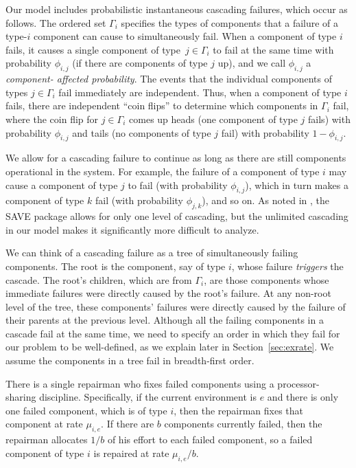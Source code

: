 \documentclass[12pt]{article}
\begin{document}
Our model includes probabilistic instantaneous cascading failures, which occur
as follows. The ordered set $\Gamma_i$ specifies the types of components that a
failure of a type-$i$ component can cause to simultaneously fail. When a
component of type $i$ fails, it causes a single  component of type~$j \in
\Gamma_i$ to fail at the same time with probability $\phi_{i, j}$ (if there are
components of type $j$ up), and we call $\phi_{i, j}$  a \textit{component-
affected probability}. The events that the individual components of types $j \in
\Gamma_i$ fail immediately are independent. Thus, when a component of type $i$
fails, there are independent ``coin flips'' to determine which components in
$\Gamma_i$ fail, where the coin flip for $j \in \Gamma_i$ comes up heads (one
component of type $j$ fails) with probability $\phi_{i, j}$ and tails (no
components of type $j$ fail) with probability $1 - \phi_{i, j}$.

We allow for a cascading failure to continue as long as there are still
components operational in the system.  For example, the failure of a component
of type $i$ may cause a component of type $j$ to fail (with probability
$\phi_{i, j}$), which in turn makes a component of type $k$ fail (with
probability $\phi_{j, k}$), and so on. As noted in \cite{ING:2009}, the SAVE
package \cite{BHLNS:1994} allows for only one level of cascading, but the
unlimited cascading in our model makes it significantly more difficult to
analyze.

We can think of a cascading failure as a tree of simultaneously failing
components. The root is the component, say of type $i$, whose failure
\textit{triggers} the cascade. The root's children, which are from $\Gamma_i$,
are those components whose immediate failures were directly caused by the root's
failure. At any non-root level of the tree,  these components' failures were
directly caused by the failure of their parents at the previous level. Although
all the failing components in a cascade fail at the same time, we need to
specify an order in which they fail for our problem to be well-defined, as we
explain later in Section~\ref{sec:exrate}. We assume the components in a tree
fail in breadth-first order.

There is a single repairman who fixes failed components using a processor-
sharing discipline. Specifically, if the current environment is $e$ and there is
only one failed component, which is of type $i$, then the repairman fixes that
component at rate $\mu_{i, e}$. If there are $b$ components currently failed,
then the repairman allocates $1 / b$ of his effort to each failed component, so
a failed component of type $i$ is repaired at rate $\mu_{i, e}/b$.
\end{document}
